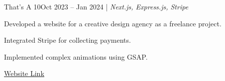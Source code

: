 \resumeSubheadings
{That's A 10}{Oct 2023 -- Jan 2024}
{}{}{| \textit{Next.js, Express.js, Stripe}}
\resumeItemListStart
\item Developed a website for a creative design agency as a freelance project.
\item Integrated Stripe for collecting payments.
\item Implemented complex animations using GSAP.
\item \href{https://ta10.vercel.app}{\underline{Website Link}}
\resumeItemListEnd